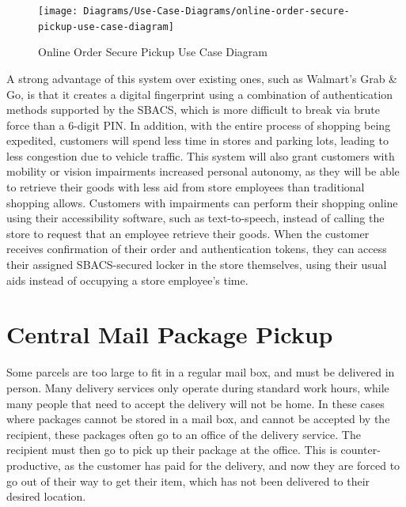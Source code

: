 \documentclass[12pt]{report}
\let\Oldsection\section
\renewcommand{\section}{\FloatBarrier\Oldsection}
\begin{document}

\begin{figure}
    \texttt{[image: Diagrams/Use-Case-Diagrams/online-order-secure-pickup-use-case-diagram]}
    \caption{Online Order Secure Pickup Use Case Diagram}
    \label{fig:online-order-secure-pickup-use-case}
\end{figure}

A strong advantage of this system over existing ones, such as Walmart's Grab \& Go, is that it creates a digital 
fingerprint using a combination of authentication methods supported by the SBACS, which is more difficult to 
break via brute force than a 6-digit PIN. In addition, with the entire process of shopping being 
expedited, customers will spend less time in stores and parking lots, leading to less congestion due to vehicle 
traffic. This system will also grant customers with mobility or vision impairments increased personal autonomy, as 
they will be able to retrieve their goods with less aid from store employees than traditional shopping allows. Customers
with impairments can perform their shopping online using their accessibility software, such as text-to-speech, instead 
of calling the store to request that an employee retrieve their goods. When the customer receives confirmation of their 
order and authentication tokens, they can access their assigned SBACS-secured locker in the store themselves, using 
their usual aids instead of occupying a store employee's time.


\section{Central Mail Package Pickup} \label{central-mail-package-pickup}

Some parcels are too large to fit in a regular mail box, and must be delivered in person. Many delivery services only 
operate during standard work hours, while many people that need to accept the delivery will not be home. In these cases 
where packages cannot be stored in a mail box, and cannot be accepted by the recipient, these packages often go to an office 
of the delivery service. The recipient must then go to pick up their package at the office. This is counter-productive, 
as the customer has paid for the delivery, and now they are forced to go out of their way to get their item, which has not 
been delivered to their desired location.
\end{document}

